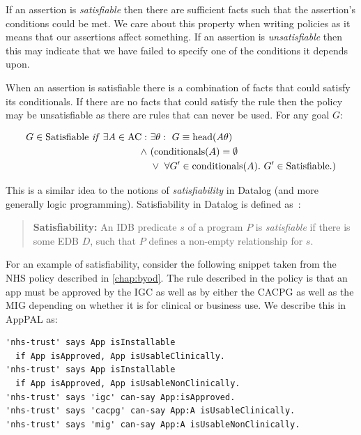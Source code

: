 \documentclass[thesis.tex]{subfiles}
\begin{document}
If an assertion is \emph{satisfiable} then there are sufficient facts
such that the assertion's conditions could be met.  We care about this
property when writing policies as it means that our assertions affect
something.  If an assertion is \emph{unsatisfiable} then this may
indicate that we have failed to specify one of the conditions it
depends upon.

When an assertion is satisfiable there is a combination of facts that
could satisfy its conditionals. If there are no facts that could
satisfy the rule then the policy may be unsatisfiable as there are
rules that can never be used.  For any goal $G$:

\begin{align*}
  G \in \text{Satisfiable}~\text{\textit{if}}~\exists A \in \text{AC}:~&\exists \theta:~G\equiv\text{head}(A\theta) \\
                                                              \wedge~ & (\text{conditionals}(A) = \emptyset \\
                                                                      & \vee~\forall G^\prime \in \text{conditionals}(A).~G^\prime \in \text{Satisfiable}.)
\end{align*}

This is a similar idea to the notions of \emph{satisfiability} in Datalog (and
more generally logic programming).  Satisfiability in Datalog is defined
as~\cite{alon_levy_equivalence_1993}:

\begin{quote}
  \textbf{Satisfiability:} An IDB predicate $s$ of a program $P$ is
  \emph{satisfiable} if there is some EDB $D$, such that $P$ defines a
  non-empty relationship for $s$.
\end{quote}

For an example of satisfiability, consider the following snippet taken
from the NHS policy described in \autoref{chap:byod}.  The rule
described in the policy is that an app must be approved by the
\ac{IGC} as well as by either the \ac{CACPG} as well as the \ac{MIG}
depending on whether it is for clinical or business use. We describe
this in AppPAL as:

\begin{lstlisting}
'nhs-trust' says App isInstallable
  if App isApproved, App isUsableClinically.
'nhs-trust' says App isInstallable
  if App isApproved, App isUsableNonClinically.
'nhs-trust' says 'igc' can-say App:isApproved.
'nhs-trust' says 'cacpg' can-say App:A isUsableClinically.
'nhs-trust' says 'mig' can-say App:A isUsableNonClinically.
\end{lstlisting}
\end{document}
